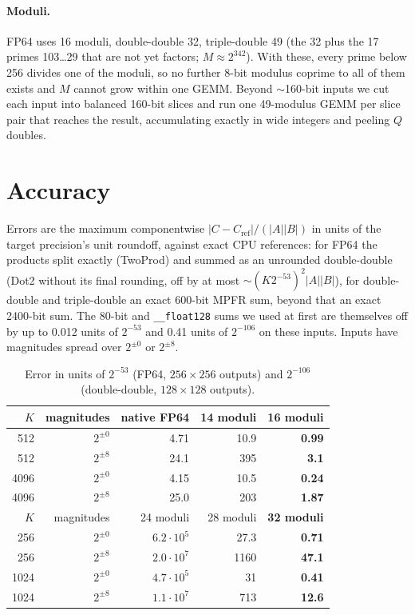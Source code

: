 \documentclass[11pt]{article}
\begin{document}
\paragraph{Moduli.} FP64 uses 16 moduli, double-double 32, triple-double 49 (the 32 plus the 17 primes 103\ldots 29 that are
not yet factors; $M\approx 2^{342}$). With these, every prime below 256 divides one of the moduli, so no further 8-bit modulus
coprime to all of them exists and $M$ cannot grow within one GEMM. Beyond $\sim$160-bit inputs we cut each input into balanced 160-bit slices and run one 49-modulus GEMM per
slice pair that reaches the result, accumulating exactly in wide integers and peeling $Q$ doubles.

\section{Accuracy}
Errors are the maximum componentwise $|C-C_{\mathrm{ref}}|/(|A||B|)$ in units of the target precision's unit roundoff,
against exact CPU references: for FP64 the products split exactly (TwoProd) and summed as an unrounded double-double (Dot2
without its final rounding, off by at most $\sim(K2^{-53})^2|A||B|$), for double-double and triple-double an exact 600-bit
MPFR sum, beyond that an exact 2400-bit sum. The 80-bit and \texttt{\_\_float128} sums we used at first are themselves off by
up to 0.012 units of $2^{-53}$ and 0.41 units of $2^{-106}$ on these inputs. Inputs have magnitudes spread over $2^{\pm 0}$ or
$2^{\pm 8}$.

\begin{table}[h]\centering
\caption{Error in units of $2^{-53}$ (FP64, $256\times256$ outputs) and $2^{-106}$ (double-double, $128\times128$ outputs).}
\begin{tabular}{rrrrr}\toprule
$K$ & magnitudes & native FP64 & 14 moduli & \textbf{16 moduli} \\\midrule
512 & $2^{\pm0}$ & 4.71 & 10.9 & \textbf{0.99} \\
512 & $2^{\pm8}$ & 24.1 & 395 & \textbf{3.1} \\
4096 & $2^{\pm0}$ & 4.15 & 10.5 & \textbf{0.24} \\
4096 & $2^{\pm8}$ & 25.0 & 203 & \textbf{1.87} \\\midrule
$K$ & magnitudes & 24 moduli & 28 moduli & \textbf{32 moduli} \\\midrule
256 & $2^{\pm0}$ & $6.2\cdot10^5$ & 27.3 & \textbf{0.71} \\
256 & $2^{\pm8}$ & $2.0\cdot10^7$ & 1160 & \textbf{47.1} \\
1024 & $2^{\pm0}$ & $4.7\cdot10^5$ & 31 & \textbf{0.41} \\
1024 & $2^{\pm8}$ & $1.1\cdot10^7$ & 713 & \textbf{12.6} \\\bottomrule
\end{tabular}
\end{table}
\end{document}
